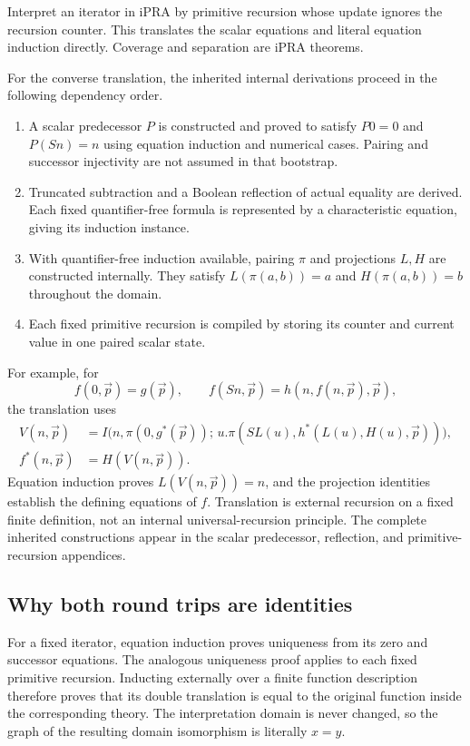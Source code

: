 \documentclass[11pt,letterpaper]{article}
\theoremstyle{definition}\newtheorem{definition}[theorem]{Definition}
\theoremstyle{remark}\newtheorem{remark}[theorem]{Remark}
\begin{document}
Interpret an iterator in iPRA by primitive recursion whose update ignores
the recursion counter. This translates the scalar equations and literal
equation induction directly. Coverage and separation are iPRA theorems.

For the converse translation, the inherited internal derivations proceed
in the following dependency order.
\begin{enumerate}
\item A scalar predecessor $P$ is constructed and proved to satisfy
  $P0=0$ and $P(Sn)=n$ using equation induction and numerical cases.
  Pairing and successor injectivity are not assumed in that bootstrap.
\item Truncated subtraction and a Boolean reflection of actual equality
  are derived. Each fixed quantifier-free formula is represented by a
  characteristic equation, giving its induction instance.
\item With quantifier-free induction available, pairing $\pi$ and
  projections $L,H$ are constructed internally. They satisfy
  $L(\pi(a,b))=a$ and $H(\pi(a,b))=b$ throughout the domain.
\item Each fixed primitive recursion is compiled by storing its counter
  and current value in one paired scalar state.
\end{enumerate}

For example, for
\[
 f(0,\vec p)=g(\vec p),\qquad
 f(Sn,\vec p)=h(n,f(n,\vec p),\vec p),
\]
the translation uses
\[
\begin{split}
 V(n,\vec p)&=I\bigl(n,\pi(0,g^*(\vec p));\,
 u.\pi(SL(u),h^*(L(u),H(u),\vec p))\bigr),\\
 f^*(n,\vec p)&=H(V(n,\vec p)).
\end{split}
\]
Equation induction proves $L(V(n,\vec p))=n$, and the projection
identities establish the defining equations of $f$. Translation is
external recursion on a fixed finite definition, not an internal
universal-recursion principle. The complete inherited constructions
appear in the scalar predecessor, reflection, and primitive-recursion
appendices.

\subsection{Why both round trips are identities}

For a fixed iterator, equation induction proves uniqueness from its
zero and successor equations. The analogous uniqueness proof applies
to each fixed primitive recursion. Inducting externally over a finite
function description therefore proves that its double translation is
equal to the original function inside the corresponding theory. The
interpretation domain is never changed, so the graph of the resulting
domain isomorphism is literally $x=y$.
\end{document}
